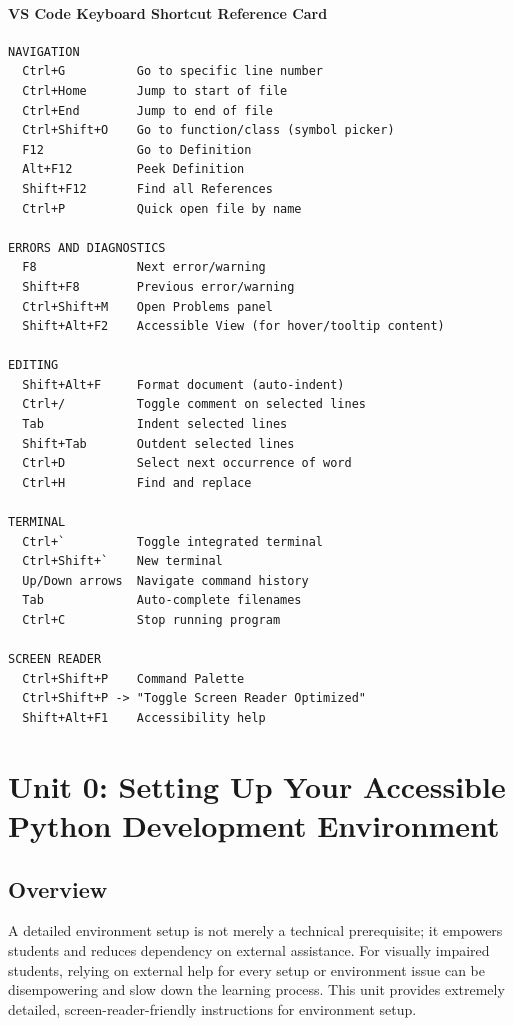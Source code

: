 \documentclass[
  justified,
  openright,
]{tufte-book}
\let\subsubsection\paragraph
\let\paragraph\paragraph
\let\subsubsection\paragraph
\let\paragraph\paragraph
\begin{document}
\subsubsection{VS Code Keyboard Shortcut Reference
Card}\label{vs-code-keyboard-shortcut-reference-card}

\begin{verbatim}
NAVIGATION
  Ctrl+G          Go to specific line number
  Ctrl+Home       Jump to start of file
  Ctrl+End        Jump to end of file
  Ctrl+Shift+O    Go to function/class (symbol picker)
  F12             Go to Definition
  Alt+F12         Peek Definition
  Shift+F12       Find all References
  Ctrl+P          Quick open file by name

ERRORS AND DIAGNOSTICS
  F8              Next error/warning
  Shift+F8        Previous error/warning
  Ctrl+Shift+M    Open Problems panel
  Shift+Alt+F2    Accessible View (for hover/tooltip content)

EDITING
  Shift+Alt+F     Format document (auto-indent)
  Ctrl+/          Toggle comment on selected lines
  Tab             Indent selected lines
  Shift+Tab       Outdent selected lines
  Ctrl+D          Select next occurrence of word
  Ctrl+H          Find and replace

TERMINAL
  Ctrl+`          Toggle integrated terminal
  Ctrl+Shift+`    New terminal
  Up/Down arrows  Navigate command history
  Tab             Auto-complete filenames
  Ctrl+C          Stop running program

SCREEN READER
  Ctrl+Shift+P    Command Palette
  Ctrl+Shift+P -> "Toggle Screen Reader Optimized"
  Shift+Alt+F1    Accessibility help
\end{verbatim}

\newpage

\section{Unit 0: Setting Up Your Accessible Python Development
Environment}\label{unit-0-setting-up-your-accessible-python-development-environment}

\subsection{Overview}\label{overview}

A detailed environment setup is not merely a technical prerequisite; it
empowers students and reduces dependency on external assistance. For
visually impaired students, relying on external help for every setup or
environment issue can be disempowering and slow down the learning
process. This unit provides extremely detailed, screen-reader-friendly
instructions for environment setup.
\end{document}
